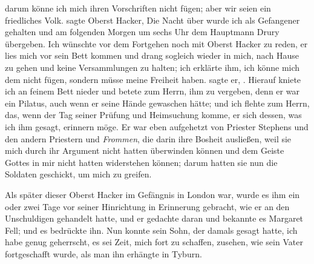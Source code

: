 darum könne ich mich ihren Vorschriften nicht fügen; aber wir
seien ein friedliches Volk.  sagte Oberst 
Hacker,  Die Nacht über wurde ich als Gefangener
gehalten und am folgenden Morgen um sechs Uhr dem 
Hauptmann Drury übergeben. 
Ich wünschte vor dem Fortgehen noch
mit Oberst Hacker zu reden, er lies mich vor sein Bett kommen und
drang sogleich wieder in mich, nach Hause zu gehen und keine
Versammlungen zu halten; ich erklärte ihm, ich könne mich dem
nicht fügen, sondern müsse meine Freiheit haben.  sagte
er, . Hierauf kniete ich an feinem
Bett nieder und betete zum Herrn, 
ihm zu vergeben, denn er war
ein Pilatus, auch wenn er seine Hände gewaschen hätte; und ich
flehte zum Herrn, das, wenn der Tag seiner Prüfung und 
Heimsuchung komme, er sich dessen, was ich ihm gesagt, erinnern möge.
Er war eben aufgehetzt von Priester Stephens und den andern
Priestern und \textit{Frommen}, die darin ihre Bosheit ausließen, weil
sie mich durch ihr Argument nicht hatten überwinden können
und dem Geiste Gottes in mir nicht hatten widerstehen können;
darum hatten sie nun die Soldaten geschickt, um mich zu greifen.


Als später dieser Oberst Hacker im Gefängnis in London
war, wurde es ihm ein oder zwei Tage vor seiner Hinrichtung
in Erinnerung gebracht, wie er an den Unschuldigen gehandelt
hatte, und er gedachte daran und bekannte es Margaret 
Fell;
und es bedrückte ihn. Nun konnte sein Sohn, der damals
gesagt hatte, ich habe genug geherrscht, es sei Zeit, mich fort zu
schaffen, zusehen, wie sein Vater fortgeschafft wurde, als man ihn
erhängte in Tyburn.

